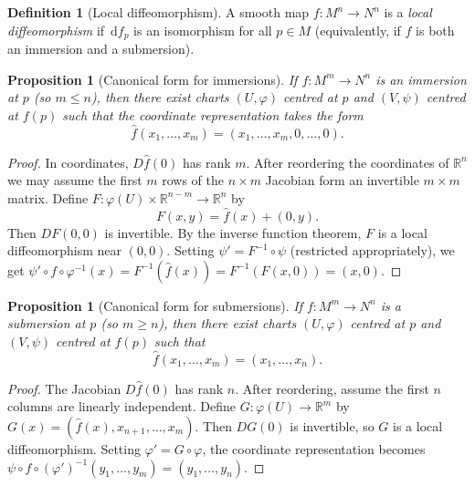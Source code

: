 \documentclass[12pt,a4paper,openany]{book}
\newtheorem{proposition}[theorem]{Proposition}
\theoremstyle{definition}
\newtheorem{definition}[theorem]{Definition}
\theoremstyle{remark}
\newcommand{\R}{\mathbb{R}}
\newcommand{\dd}{\,\mathrm{d}}
\begin{document}
\begin{definition}[Local diffeomorphism]\label{def:local-diffeomorphism}
A smooth map $f \colon M^n \to N^n$ is a \emph{local diffeomorphism} if
$\dd f_p$ is an isomorphism for all $p \in M$ (equivalently, if $f$ is both
an immersion and a submersion).
\end{definition}

\begin{proposition}[Canonical form for immersions]\label{prop:immersion-canonical}
If $f \colon M^m \to N^n$ is an immersion at $p$ (so $m \leq n$), then
there exist charts $(U,\varphi)$ centred at $p$ and $(V,\psi)$ centred at
$f(p)$ such that the coordinate representation takes the form
\[
  \hat{f}(x_1, \ldots, x_m) = (x_1, \ldots, x_m, 0, \ldots, 0).
\]
\end{proposition}

\begin{proof}
In coordinates, $D\hat{f}(0)$ has rank $m$.  After reordering the
coordinates of $\R^n$ we may assume the first $m$ rows of the $n \times m$
Jacobian form an invertible $m \times m$ matrix.  Define
$F \colon \varphi(U) \times \R^{n-m} \to \R^n$ by
\[
  F(x, y) = \hat{f}(x) + (0, y).
\]
Then $DF(0,0)$ is invertible.  By the inverse function theorem, $F$ is a
local diffeomorphism near $(0,0)$.  Setting $\psi' = F^{-1} \circ \psi$
(restricted appropriately), we get $\psi' \circ f \circ \varphi^{-1}(x) =
F^{-1}(\hat{f}(x)) = F^{-1}(F(x,0)) = (x, 0)$.
\end{proof}

\begin{proposition}[Canonical form for submersions]\label{prop:submersion-canonical}
If $f \colon M^m \to N^n$ is a submersion at $p$ (so $m \geq n$), then
there exist charts $(U,\varphi)$ centred at $p$ and $(V,\psi)$ centred at
$f(p)$ such that
\[
  \hat{f}(x_1, \ldots, x_m) = (x_1, \ldots, x_n).
\]
\end{proposition}

\begin{proof}
The Jacobian $D\hat{f}(0)$ has rank $n$.  After reordering, assume the first
$n$ columns are linearly independent.  Define
$G \colon \varphi(U) \to \R^m$ by $G(x) = (\hat{f}(x), x_{n+1},\ldots,x_m)$.
Then $DG(0)$ is invertible, so $G$ is a local diffeomorphism.  Setting
$\varphi' = G \circ \varphi$, the coordinate representation becomes
$\psi \circ f \circ (\varphi')^{-1}(y_1,\ldots,y_m) = (y_1,\ldots,y_n)$.
\end{proof}
\end{document}
